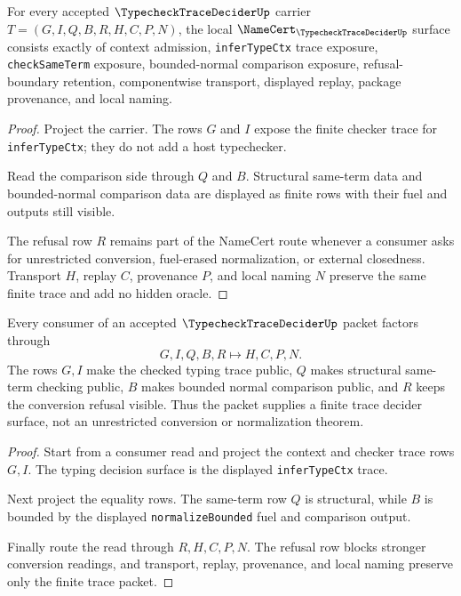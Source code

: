 \begin{theorem}
\label{thm:typecheck-trace-decider-obligations}
For every accepted $\TypecheckTraceDeciderUp$ carrier $T=(G,I,Q,B,R,H,C,P,N)$, the local $\NameCert_{\TypecheckTraceDeciderUp}$ surface consists exactly of context admission, \texttt{inferTypeCtx} trace exposure, \texttt{checkSameTerm} exposure, bounded-normal comparison exposure, refusal-boundary retention, componentwise transport, displayed replay, package provenance, and local naming.
\end{theorem}
\begin{proof}
Project the carrier. The rows $G$ and $I$ expose the finite checker trace for \texttt{inferTypeCtx}; they do not add a host typechecker.

Read the comparison side through $Q$ and $B$. Structural same-term data and bounded-normal comparison data are displayed as finite rows with their fuel and outputs still visible.

The refusal row $R$ remains part of the NameCert route whenever a consumer asks for unrestricted conversion, fuel-erased normalization, or external closedness. Transport $H$, replay $C$, provenance $P$, and local naming $N$ preserve the same finite trace and add no hidden oracle.
\end{proof}

\begin{theorem}
\label{thm:typecheck-trace-decider-replay-boundary}
Every consumer of an accepted $\TypecheckTraceDeciderUp$ packet factors through
$$
G,I,Q,B,R \longmapsto H,C,P,N .
$$
The rows $G,I$ make the checked typing trace public, $Q$ makes structural same-term checking public, $B$ makes bounded normal comparison public, and $R$ keeps the conversion refusal visible. Thus the packet supplies a finite trace decider surface, not an unrestricted conversion or normalization theorem.
\end{theorem}
\begin{proof}
Start from a consumer read and project the context and checker trace rows $G,I$. The typing decision surface is the displayed \texttt{inferTypeCtx} trace.

Next project the equality rows. The same-term row $Q$ is structural, while $B$ is bounded by the displayed \texttt{normalizeBounded} fuel and comparison output.

Finally route the read through $R,H,C,P,N$. The refusal row blocks stronger conversion readings, and transport, replay, provenance, and local naming preserve only the finite trace packet.
\end{proof}

